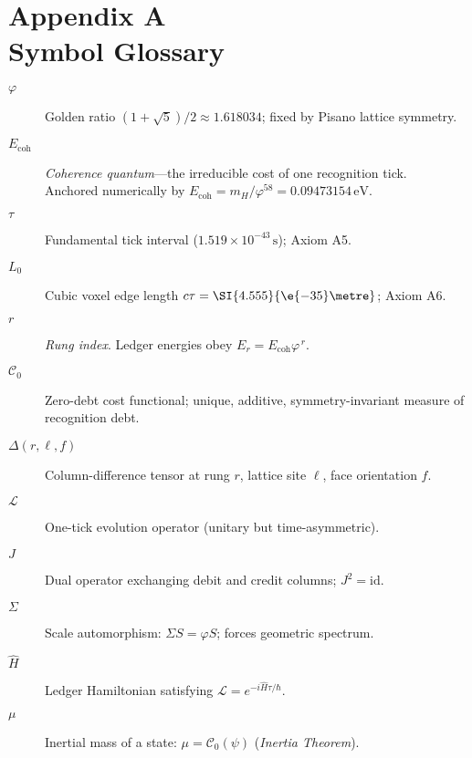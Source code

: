 \documentclass[11pt]{article}
\begin{document}
\section*{Appendix A\\Symbol Glossary}
\begin{description}
\item[$\varphi$] Golden ratio $(1+\sqrt{5})/2 \approx 1.618034$; fixed by Pisano lattice symmetry.

\item[$E_{\text{coh}}$] \textit{Coherence quantum}---the irreducible cost of one recognition tick.\\
Anchored numerically by $E_{\text{coh}} = m_H/\varphi^{58} = 0.09473154\,\text{eV}$.

\item[$\tau$] Fundamental tick interval ($1.519 \times 10^{-43}\,\text{s}$); Axiom A5.


\item[$L_{0}$] Cubic voxel edge length $c\tau=\SI{4.555}{\e{-35}\metre}$; Axiom A6.

\item[$r$] \textit{Rung index}.  Ledger energies obey $E_r = E_{\text{coh}}\varphi^{\,r}$.

\item[$\mathcal{C}_{0}$] Zero-debt cost functional; unique, additive, symmetry-invariant measure of recognition debt.

\item[$\Delta(r,\ell,f)$] Column-difference tensor at rung $r$, lattice site $\ell$, face orientation $f$.

\item[$\mathcal{L}$] One-tick evolution operator (unitary but time-asymmetric).

\item[$J$] Dual operator exchanging debit and credit columns; $J^2=\mathrm{id}$.

\item[$\Sigma$] Scale automorphism: $\Sigma S = \varphi S$; forces geometric spectrum.

\item[$\widehat{H}$] Ledger Hamiltonian satisfying $\mathcal{L}=e^{-i\widehat{H}\tau/\hbar}$.

\item[$\mu$] Inertial mass of a state: $\mu=\mathcal{C}_{0}(\psi)$ (\emph{Inertia Theorem}).


\end{description}
\end{document}
